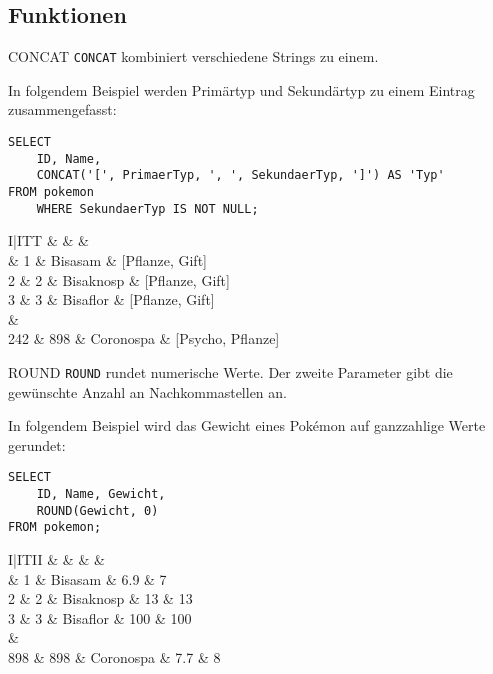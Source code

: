 \subsection{Funktionen}

\begin{sql}{CONCAT}
    \texttt{CONCAT} kombiniert verschiedene Strings zu einem.

    In folgendem Beispiel werden Primärtyp und Sekundärtyp zu einem Eintrag zusammengefasst:

    \begin{verbatim}
SELECT
    ID, Name,
    CONCAT('[', PrimaerTyp, ', ', SekundaerTyp, ']') AS 'Typ'
FROM pokemon
    WHERE SekundaerTyp IS NOT NULL;
    \end{verbatim}

    \begin{tabular}{I|ITT}
        &  &  &  \\ & 1 & Bisasam & [Pflanze, Gift] \\
        2 & 2 & Bisaknosp & [Pflanze, Gift] \\
        3 & 3 & Bisaflor & [Pflanze, Gift] \\
         &  \\
        242 & 898 & Coronospa & [Psycho, Pflanze] \\
    \end{tabular}
\end{sql}

\begin{sql}{ROUND}
    \texttt{ROUND} rundet numerische Werte.
    Der zweite Parameter gibt die gewünschte Anzahl an Nachkommastellen an.

    In folgendem Beispiel wird das Gewicht eines Pokémon auf ganzzahlige Werte gerundet:

    \begin{verbatim}
SELECT
    ID, Name, Gewicht,
    ROUND(Gewicht, 0)
FROM pokemon;
    \end{verbatim}

    \begin{tabular}{I|ITII}
        &  &  &  &  \\ & 1 & Bisasam & 6.9 & 7 \\
        2 & 2 & Bisaknosp & 13 & 13 \\
        3 & 3 & Bisaflor & 100 & 100 \\
         &  \\
        898 & 898 & Coronospa & 7.7 & 8 \\
    \end{tabular}
\end{sql}

